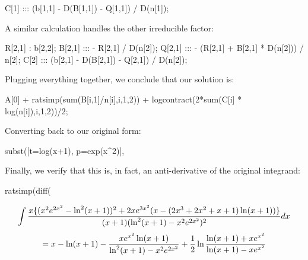 \begin{maximacode}
C[1] :::
   (b[1,1] - D(B[1,1]) - Q[1,1]) / D(n[1]);
\end{maximacode}

A similar calculation handles the other irreducible factor:

\begin{maximacode}
R[2,1] : b[2,2];
B[2,1] ::: - R[2,1] / D(n[2]);
Q[2,1] :::
   - (R[2,1] + B[2,1] * D(n[2])) / n[2];
C[2] :::
   (b[2,1] - D(B[2,1]) - Q[2,1]) / D(n[2]);
\end{maximacode}

Plugging everything together, we conclude that our solution is:

\begin{maximacode}
A[0] + ratsimp(sum(B[i,1]/n[i],i,1,2))
   + logcontract(2*sum(C[i] * log(n[i]),i,1,2))/2;
\end{maximacode}

\begin{comment}
\begin{multline*}
\int{{x\{(x^2 \psi^2-\theta^2)^2+2x \psi^3(x-(2x^3+2x^2+x+1)\theta)\}}\over{(x+1)(\theta^2 - x^2\psi^2)^2}} dx \\
= x - \theta -\frac{\frac{x}{2}\psi}{\theta + x \psi} - \frac{\frac{x}{2}\psi}{\theta - x \psi} + \frac{1}{2}\ln(\theta + x\psi)- \frac{1}{2}\ln(\theta - x \psi)
\end{multline*}

$$ = x - \theta -\frac{x \psi \theta}{\theta^2 - x^2 \psi^2} + \frac{1}{2}\ln\frac{\theta + x\psi}{\theta - x \psi}$$
\end{comment}

Converting back to our original form:

\begin{maximacode}
subst([t=log(x+1), p=exp(x^2)], %
\end{maximacode}

Finally, we verify that this is, in fact,
an anti-derivative of the original integrand:

\begin{maximacode}
ratsimp(diff(%
\end{maximacode}

$$\int{{x\{(x^2e^{2x^2}-\ln^2(x+1))^2+2xe^{3x^2}(x-(2x^3+2x^2+x+1)\ln(x+1))\}}\over{(x+1)(\ln^2(x+1) - x^2e^{2x^2})^2}} dx$$
$$= x - \ln(x+1) - {x e^{x^2}\ln(x+1)\over{\ln^2(x+1)-x^2 e^{2x^2}}}
+ {1\over2}\ln\frac{\ln(x+1) + x e^{x^2}}{\ln(x+1) - x e^{x^2}}$$

